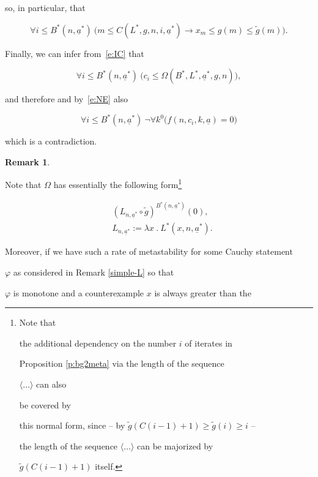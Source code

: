 \documentclass[1p]{elsarticle}
\newcommand{\tup}{\underline} %
\theoremstyle{plain}
\theoremstyle{definition}
\newtheorem{rmk}[thm]{Remark}
\theoremstyle{remark}
\renewenvironment{proof}[1][]{\noindent{\bf Proof{#1}. }}{\nopagebreak[4]{\hspace*{\fill}


  $\Box$              %

 }{\vspace{2ex}}}
\theoremstyle{definition}
\begin{document}
{\begin{proof}
so, in particular, that

\[ \forall i\leq B^*(n,\underline{a}^*)\ \big(m\leq C(L^*,g,n,i,\underline{a}^*)

\rightarrow x_m\leq g(m)\leq \tilde g(m) \big). \]

Finally, we can infer from~\eqref{e:IC} that

\[ \forall i\leq B^*(n,\underline{a}^*)\ 

\big(c_i\leq \Omega(B^*,L^*,\underline{a}^*,g,n)\big),\]

and therefore and by~\eqref{e:NE} also

\[ \forall i\leq B^*(n,\underline{a}^*)\ \neg\forall k^0\big( 

f(n,c_i,k,\underline{a})=0\big) \]

which is a contradiction.



\end{proof}



\begin{rmk}\label{r:metastr}

Note that $\Omega$ has essentially the following form\footnote{Note that 

the additional dependency on the number $i$ of iterates in 

Proposition \ref{p:bg2meta} via the length of the sequence 

$\langle \ldots\rangle$ can also 

be covered by 

this normal form, since -- by $\tilde{g}(C(i-1)+1)\ge\tilde{g}(i)\ge i$ -- 

the length of the sequence $\langle\ldots\rangle$  can be majorized by 

$\tilde{g}(C(i-1)+1)$ itself.}

\begin{align*}

&(L_{n,\tup a^*}\circ \tilde{g})^{B^*(n,\tup a^*)}(0),\\

&L_{n,\tup a^*}:=\lambda x\ .\ L^*(x,n,\tup a^*).

\end{align*}

Moreover, if we have such a rate of metastability for some Cauchy statement 

$\varphi$ as considered in Remark \ref{simple-L} so that 

$\varphi$ is monotone and a counterexample $x$ is always greater than the 


\end{rmk}}
\end{document}
